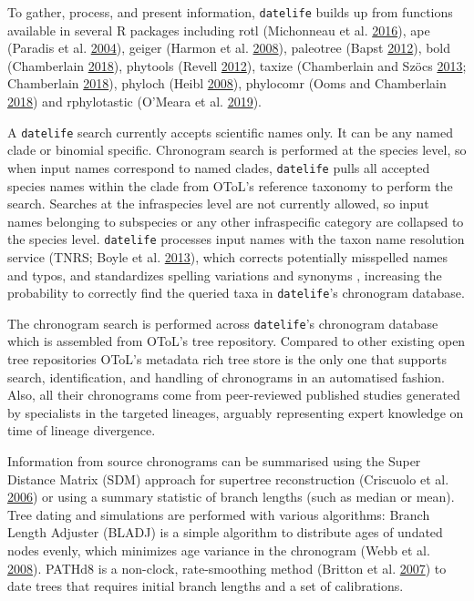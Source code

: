 \documentclass[]{article}
\begin{document}
To gather, process, and present information, \texttt{datelife} builds up from functions
available in several R packages including rotl (Michonneau et al. \protect\hyperlink{ref-Michonneau2016}{2016}), ape (Paradis et al. \protect\hyperlink{ref-Paradis2004}{2004}),
geiger (Harmon et al. \protect\hyperlink{ref-Harmon2008}{2008}), paleotree (Bapst \protect\hyperlink{ref-Bapst2012a}{2012}), bold (Chamberlain \protect\hyperlink{ref-Chamberlain2018}{2018}), phytools (Revell \protect\hyperlink{ref-Revell2012}{2012}), taxize (Chamberlain and Szöcs \protect\hyperlink{ref-Chamberlain2013}{2013}; Chamberlain \protect\hyperlink{ref-Chamberlain2018}{2018}), phyloch (Heibl \protect\hyperlink{ref-Heibl2008}{2008}), phylocomr (Ooms and Chamberlain \protect\hyperlink{ref-Ooms2018}{2018}) and rphylotastic (O'Meara et al. \protect\hyperlink{ref-Omeara2019}{2019}).

A \texttt{datelife} search currently accepts scientific names only. It can be any named clade or binomial specific.
Chronogram search is performed at the species level, so when input names correspond
to named clades, \texttt{datelife} pulls all accepted species names within the
clade from OToL's reference taxonomy to perform the search.
Searches at the infraspecies level are not currently allowed, so input names belonging to subspecies or any other infraspecific category are collapsed to the species level.
\texttt{datelife} processes input names with the taxon name resolution service (TNRS; Boyle et al. \protect\hyperlink{ref-Boyle2013}{2013}),
which corrects potentially misspelled names and typos, and standardizes spelling
variations and synonyms , increasing the probability to correctly find the
queried taxa in \texttt{datelife}'s chronogram database.

The chronogram search is performed across \texttt{datelife}'s chronogram database which is assembled from OToL's tree repository. Compared to other existing open tree repositories OToL's metadata rich tree store is the only one that supports search, identification, and handling of chronograms in an automatised fashion. Also, all their chronograms come from peer-reviewed published studies generated by specialists in the targeted lineages, arguably representing expert knowledge on time of lineage divergence.

Information from source chronograms can be summarised using the Super Distance Matrix (SDM) approach for supertree reconstruction (Criscuolo et al. \protect\hyperlink{ref-Criscuolo2006}{2006}) or using a summary statistic of branch
lengths (such as median or mean).
Tree dating and simulations are performed with various algorithms:
Branch Length Adjuster (BLADJ) is a simple algorithm to distribute ages of undated
nodes evenly, which minimizes age variance in the chronogram (Webb et al. \protect\hyperlink{ref-Webb2008}{2008}).
PATHd8 is a non-clock, rate-smoothing method (Britton et al. \protect\hyperlink{ref-Britton2007}{2007}) to date trees that requires initial branch lengths and a set of calibrations.
\end{document}
